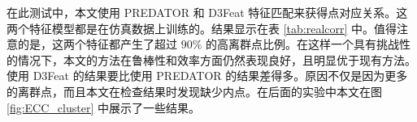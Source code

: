在此测试中，本文使用 PREDATOR\cite{huang2021predator} 和 D3Feat\cite{bai2020d3feat} 特征匹配来获得点对应关系。这两个特征模型都是在仿真数据上训练的。结果显示在表 \ref{tab:realcorr} 中。值得注意的是，这两个特征都产生了超过 $90\%$ 的高离群点比例。在这样一个具有挑战性的情况下，本文的方法在鲁棒性和效率方面仍然表现良好，且明显优于现有方法。使用 D3Feat 的结果要比使用 PREDATOR 的结果差得多。原因不仅是因为更多的离群点，而且本文在检查结果时发现缺少内点。在后面的实验中本文在图 \ref{fig:ECC_cluster} 中展示了一些结果。

\begin{table}[ht]
        \centering
        \caption{在不同离群比例的仿真对应关系上的结果。$\uparrow$ 表示越大越好，而 $\downarrow$ 表示相反。本文方法在 CPU/GPU 上的运行时间也展示出来。}
\end{table}
